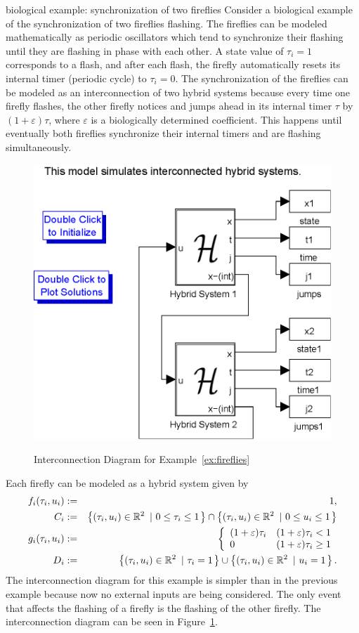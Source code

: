 
\begin{example}{biological example: synchronization of two fireflies}
\label{ex:fireflies}
Consider a biological example of the synchronization of two fireflies flashing. The fireflies can be modeled mathematically as periodic oscillators which tend to synchronize their flashing until they are flashing in phase with each other. A state value of $\tau_i=1$ corresponds to a flash, and after each flash, the firefly automatically resets its internal timer (periodic cycle) to $\tau_i=0$.  The synchronization of the fireflies can be modeled as an interconnection of two hybrid systems because every time one firefly flashes, the other firefly notices and jumps ahead in its internal timer $\tau$ by $(1+\varepsilon)\tau$, where $\varepsilon$ is a biologically determined coefficient. This happens until eventually both fireflies synchronize their internal timers and are flashing simultaneously.  
\begin{figure}[ht!]
  \begin{center}
    {\includegraphics[width=.45\textwidth]{figures/Simulink/fireflies.eps}}
   \caption{Interconnection Diagram for Example~\ref{ex:fireflies}}
\label{fig:fireflies}
  \end{center}
\end{figure}
Each firefly can be modeled as a hybrid system given by
\begin{eqnarray}
f_i(\tau_i,u_i) & := & 1, \\
C_i &: =& \left\{(\tau_i,u_i)\in {\mathbb R}^{2}\ \left| \ 0 \leq \tau_i \leq 1 \right.\right\}\cap
\left\{(\tau_i,u_i)\in {\mathbb R}^{2}\ \left| \ 0 \leq u_i \leq 1 \right.\right\} \\
g_i(\tau_i,u_i) &:=&
\left\{
\begin{array}{ll}
(1+ \varepsilon)\tau_i
& (1+\varepsilon)\tau_i<1\\
0
& (1+\varepsilon)\tau_i\geq 1
\end{array}
\right. \\
    D_i &: =& \left\{(\tau_i,u_i)\in {\mathbb R}^{2}\ \left| \ \tau_i = 1 \right.\right\} \cup \left\{(\tau_i,u_i)\in {\mathbb R}^{2}\ \left| \ u_i = 1 \right.\right\}.
\end{eqnarray}
The interconnection diagram for this example is simpler than in the previous example because now no external inputs are being considered. The only event that affects the flashing of a firefly is the flashing of the other firefly. The interconnection diagram can be seen in Figure~\ref{fig:fireflies}.


\end{example}
